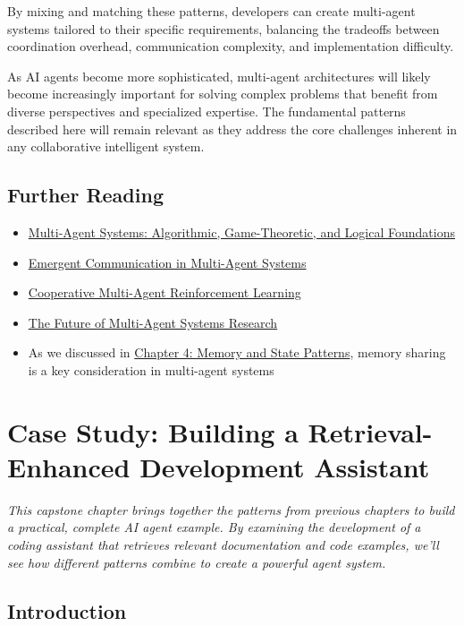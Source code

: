 \documentclass[11pt,oneside]{book}
\providecommand{\tightlist}{%
  \setlength{\itemsep}{0pt}\setlength{\parskip}{0pt}}
\begin{document}
By mixing and matching these patterns, developers can create multi-agent
systems tailored to their specific requirements, balancing the tradeoffs
between coordination overhead, communication complexity, and
implementation difficulty.

As AI agents become more sophisticated, multi-agent architectures will
likely become increasingly important for solving complex problems that
benefit from diverse perspectives and specialized expertise. The
fundamental patterns described here will remain relevant as they address
the core challenges inherent in any collaborative intelligent system.

\section{Further Reading}\label{further-reading-1}

\begin{itemize}
\tightlist
\item
  \href{https://doi.org/10.1017/CBO9780511811654}{Multi-Agent Systems:
  Algorithmic, Game-Theoretic, and Logical Foundations}
\item
  \href{https://arxiv.org/abs/2006.02419}{Emergent Communication in
  Multi-Agent Systems}
\item
  \href{https://arxiv.org/abs/2011.00583}{Cooperative Multi-Agent
  Reinforcement Learning}
\item
  \href{https://doi.org/10.1007/s10458-008-9040-0}{The Future of
  Multi-Agent Systems Research}
\item
  As we discussed in \href{04_memory_and_state_patterns.md}{Chapter 4:
  Memory and State Patterns}, memory sharing is a key consideration in
  multi-agent systems
\end{itemize}

\chapter{Case Study: Building a Retrieval-Enhanced Development
Assistant}\label{case-study-building-a-retrieval-enhanced-development-assistant}

\emph{This capstone chapter brings together the patterns from previous
chapters to build a practical, complete AI agent example. By examining
the development of a coding assistant that retrieves relevant
documentation and code examples, we'll see how different patterns
combine to create a powerful agent system.}

\section{Introduction}\label{introduction-6}
\end{document}
